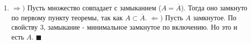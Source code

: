\begin{theorem} 
\begin{enumerate}
  Покажем, что верно следующее: $A{\subset}\bigcap\limits_{\forall\text{замкнут.}F_{\sigma}{\supset}A} F_\sigma$.\\ По 2 свойству имеем: $\overline{A}{\subset}\bigcap\limits_{\forall\text{замкнут.}F_{\sigma}{\supset}A} F_\sigma$.$(**)$ (\textit{Прим.: Над $F_{\sigma}$ нет черты, поскольку по определению $F_{\sigma}$ замкнуты.}) Из $(*)$ и $(**)$ имеем в итоге равенство.\\
  \item $\Rightarrow)$ Пусть множество совпадает с замыканием ($A=\overline{A}$). Тогда оно замкнуто по первому пункту теоремы, так как $A{\subset}\overline{A}$. 
  $\Leftarrow)$ Пусть $A$ замкнутое. По свойству 3, замыкание - минимальное замкнутое по включению. Но это и есть $A$. $\blacksquare$ 
\end{enumerate}
\end{theorem}
